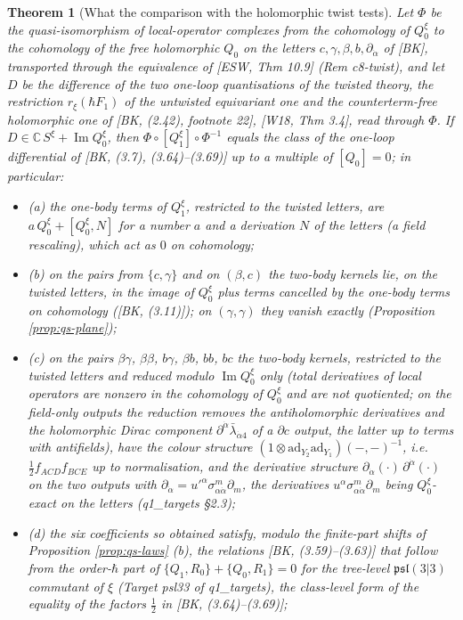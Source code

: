 \documentclass[11pt]{article}
\numberwithin{equation}{section}
\theoremstyle{plain}
\newtheorem{theorem}{Theorem}[section]
\theoremstyle{definition}
\begin{document}
\begin{theorem}[What the comparison with the holomorphic twist tests]
\label{thm:qs-twistcheck}
Let $\Phi$ be the quasi-isomorphism of local-operator complexes from the cohomology of $Q^\xi_0$ to the cohomology of the free holomorphic $Q_0$ on the letters $c,\gamma,\beta,b,\partial_{\dot\alpha}$ of [BK], transported through the equivalence of [ESW, Thm 10.9] (Rem c8-twist), and let $D$ be the difference of the two one-loop quantisations of the twisted theory, the restriction $r_\xi(\hbar F_1)$ of the untwisted equivariant one and the counterterm-free holomorphic one of [BK, (2.42), footnote 22], [W18, Thm 3.4], read through $\Phi$. If $D\in\mathbb C\,S^\xi+\operatorname{Im}Q^\xi_0$, then $\Phi\circ[Q^\xi_1]\circ\Phi^{-1}$ equals the class of the one-loop differential of [BK, (3.7), (3.64)--(3.69)] up to a multiple of $[Q_0]=0$; in particular:
\begin{itemize}
\item (a) the one-body terms of $Q^\xi_1$, restricted to the twisted letters, are $a\,Q^\xi_0+[Q^\xi_0,N]$ for a number $a$ and a derivation $N$ of the letters (a field rescaling), which act as $0$ on cohomology;
\item (b) on the pairs from $\{c,\gamma\}$ and on $(\beta,c)$ the two-body kernels lie, on the twisted letters, in the image of $Q^\xi_0$ plus terms cancelled by the one-body terms on cohomology ([BK, (3.11)]); on $(\gamma,\gamma)$ they vanish exactly (Proposition \ref{prop:qs-plane});
\item (c) on the pairs $\beta\gamma$, $\beta\beta$, $b\gamma$, $\beta b$, $bb$, $bc$ the two-body kernels, restricted to the twisted letters and reduced modulo $\operatorname{Im}Q^\xi_0$ only (total derivatives of local operators are nonzero in the cohomology of $Q^\xi_0$ and are not quotiented; on the field-only outputs the reduction removes the antiholomorphic derivatives and the holomorphic Dirac component $\partial^{\dot\alpha}\bar\lambda_{\dot\alpha4}$ of a $\partial c$ output, the latter up to terms with antifields), have the colour structure $(1\otimes\mathrm{ad}_{Y_2}\mathrm{ad}_{Y_1})(-,-)^{-1}$, i.e. $\tfrac12f_{ACD}f_{BCE}$ up to normalisation, and the derivative structure $\partial_{\dot\alpha}(\cdot)\,\partial^{\dot\alpha}(\cdot)$ on the two outputs with $\partial_{\dot\alpha}=u'^\alpha\sigma^m_{\alpha\dot\alpha}\partial_m$, the derivatives $u^\alpha\sigma^m_{\alpha\dot\alpha}\partial_m$ being $Q^\xi_0$-exact on the letters (q1\_targets §2.3);
\item (d) the six coefficients so obtained satisfy, modulo the finite-part shifts of Proposition \ref{prop:qs-laws} (b), the relations [BK, (3.59)--(3.63)] that follow from the order-$\hbar$ part of $\{Q_1,R_0\}+\{Q_0,R_1\}=0$ for the tree-level $\mathfrak{psl}(3|3)$ commutant of $\xi$ (Target psl33 of q1\_targets), the class-level form of the equality of the factors $\tfrac12$ in [BK, (3.64)--(3.69)];

\end{itemize}
\end{theorem}
\end{document}
